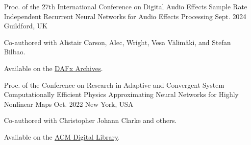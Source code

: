 

\begin{cventries}

  \cventry
    {Proc. of the 27th International Conference on Digital Audio Effects} %
    {Sample Rate Independent Recurrent Neural Networks for Audio Effects Processing} %
    {Sept. 2024} %
    {Guildford, UK} %
    {
      \begin{cvitems} %
        \item {Co-authored with Alistair Carson, Alec, Wright, Vesa Välimäki, and Stefan Bilbao.}
        \item {Available on the \href{https://www.dafx.de/paper-archive/2024/papers/DAFx24_paper_68.pdf}{DAFx Archives}.}
      \end{cvitems}
    }

  \cventry
    {Proc. of the Conference on Research in Adaptive and Convergent System} %
    {Computationally Efficient Physics Approximating Neural Networks for Highly Nonlinear Maps} %
    {Oct. 2022} %
    {New York, USA} %
    {
      \begin{cvitems} %
        \item {Co-authored with Christopher Johann Clarke and others.}
        \item {Available on the \href{https://dl.acm.org/doi/10.1145/3538641.3561501}{ACM Digital Library}.}
      \end{cvitems}
    }



\end{cventries}
